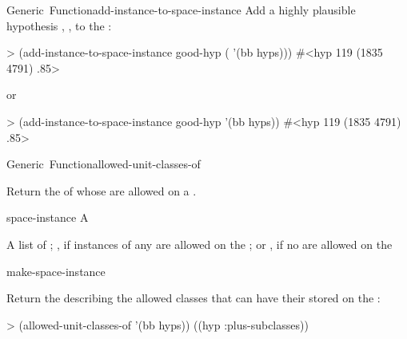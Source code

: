 \documentclass[10pt,twoside,english,pdftex]{article}
\begin{document}
\begin{functiondoc}{Generic~Function}{add-instance-to-space-instance}
\fnexamples
{}%
Add a highly plausible hypothesis ,
, to the  :
\begin{example}
> (add-instance-to-space-instance 
    good-hyp ( '(bb hyps)))
#<hyp 119 (1835 4791) .85>
\end{example}
%
or
%
\begin{example}
> (add-instance-to-space-instance good-hyp '(bb hyps))
#<hyp 119 (1835 4791) .85>
\end{example}

\end{functiondoc}


\begin{functiondoc}{Generic~Function}{allowed-unit-classes-of}%
  {
    \returns{} }
%

\fnsyntax

\fnpurpose Return the  of
 whose  are allowed on a
.

\fnmethods
{}%
  {\code{(} 
    \returns{} }

\fnpackage {}

\fnmodule {}

\fnargs
\begin{args}{space-instance}
 A 
\end{args}

\fnreturns A list of ; ,
if instances of any  are allowed on the
; or \nil, if no  are allowed on
the 

\begin{alsos}{make-space-instance}
\end{alsos}

\fnexample
Return the  describing the allowed
classes that can have their  stored on the  :
\begin{example}
> (allowed-unit-classes-of '(bb hyps))
((hyp :plus-subclasses))
\end{example}

\end{functiondoc}
\end{document}
